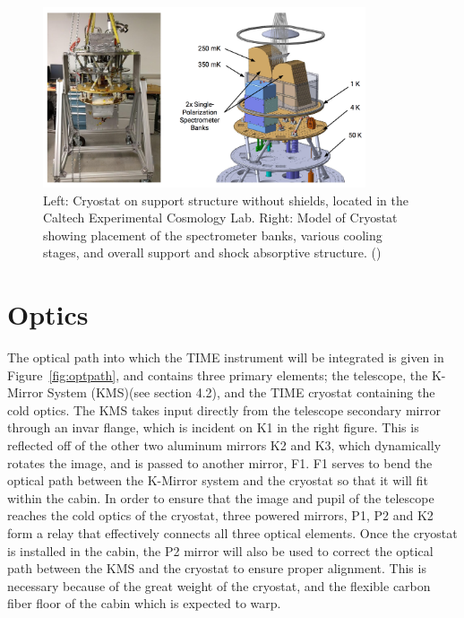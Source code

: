 \documentclass[manuscript]{aastex}
\begin{document}
\begin{figure}[H]
\centering
\captionsetup{width=0.85\textwidth}
\includegraphics[width=0.85\textwidth]{jon1.png}
\caption[TIME Cryostat -(\cite{Hunacek2016})]{Left: Cryostat on support structure without shields, located in the Caltech Experimental Cosmology Lab. Right: Model of Cryostat showing placement of the spectrometer banks, various cooling stages, and overall support and shock absorptive structure. (\cite{Hunacek2016})}
\label{fig:jon1}
\end{figure}

\section{Optics}

The optical path into which the TIME instrument will be integrated is given in Figure~\ref{fig:optpath}, and contains three primary elements; the telescope, the K-Mirror System (KMS)(see section 4.2), and the TIME cryostat containing the cold optics. The KMS takes input directly from the telescope secondary mirror through an invar flange, which is incident on K1 in the right figure. This is reflected off of the other two aluminum mirrors K2 and K3, which dynamically rotates the image, and is passed to another mirror, F1. F1 serves to bend the optical path between the K-Mirror system and the cryostat so that it will fit within the cabin. In order to ensure that the image and pupil of the telescope reaches the cold optics of the cryostat, three powered mirrors, P1, P2 and K2 form a relay that effectively connects all three optical elements. Once the cryostat is installed in the cabin, the P2 mirror will also be used to correct the optical path between the KMS and the cryostat to ensure proper alignment. This is necessary because of the great weight of the cryostat, and the flexible carbon fiber floor of the cabin which is expected to warp.
\end{document}
